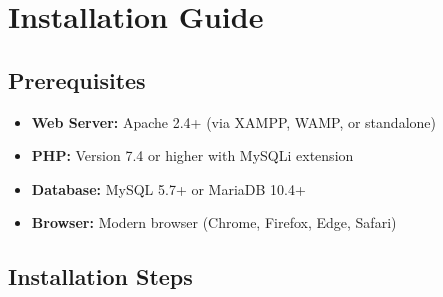 \documentclass[12pt,a4paper]{article}
\begin{document}
\section{Installation Guide}

\subsection{Prerequisites}

\begin{itemize}
    \item \textbf{Web Server:} Apache 2.4+ (via XAMPP, WAMP, or standalone)
    \item \textbf{PHP:} Version 7.4 or higher with MySQLi extension
    \item \textbf{Database:} MySQL 5.7+ or MariaDB 10.4+
    \item \textbf{Browser:} Modern browser (Chrome, Firefox, Edge, Safari)
\end{itemize}

\subsection{Installation Steps}
\end{document}
